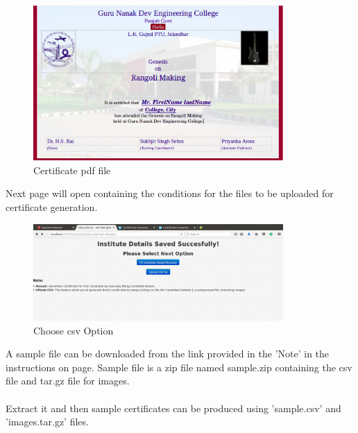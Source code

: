 \begin{figure}[!ht]
\centering
\includegraphics[width=0.85\textwidth]{images/cgs/pdf.png}
\caption{Certificate pdf file}
\hspace{-1.5em}
\end{figure}
Next page will open containing the conditions for the files to be uploaded for certificate generation.
\begin{figure}[!ht]
\centering
\includegraphics[width=0.85\textwidth]{images/cgs/cgs3.png}                  
\caption{Choose csv Option}
\hspace{-1.5em}
\end{figure}
A sample file can be downloaded from the link provided in the 'Note' in the instructions on page. Sample file is a zip file named sample.zip containing the csv file and tar.gz file for images.\\\\
Extract it and then sample certificates can be produced using 'sample.csv' and 'images.tar.gz' files.

